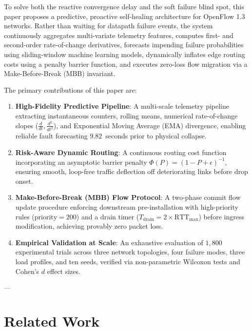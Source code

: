 \documentclass[10pt,twocolumn]{article}
\begin{document}
To solve both the reactive convergence delay and the soft failure blind spot, this paper proposes a predictive, proactive self-healing architecture for OpenFlow 1.3 networks. Rather than waiting for datapath failure events, the system continuously aggregates multi-variate telemetry features, computes first- and second-order rate-of-change derivatives, forecasts impending failure probabilities using sliding-window machine learning models, dynamically inflates edge routing costs using a penalty barrier function, and executes zero-loss flow migration via a Make-Before-Break (MBB) invariant.

The primary contributions of this paper are:
\begin{enumerate}
    \item \textbf{High-Fidelity Predictive Pipeline}: A multi-scale telemetry pipeline extracting instantaneous counters, rolling means, numerical rate-of-change slopes ($\frac{d}{dt}, \frac{d^2}{dt^2}$), and Exponential Moving Average (EMA) divergence, enabling reliable fault forecasting $9.82$~seconds prior to physical collapse.
    \item \textbf{Risk-Aware Dynamic Routing}: A continuous routing cost function incorporating an asymptotic barrier penalty $\Phi(P) = (1 - P + \epsilon)^{-1}$, ensuring smooth, loop-free traffic deflection off deteriorating links before drop onset.
    \item \textbf{Make-Before-Break (MBB) Flow Protocol}: A two-phase commit flow update procedure enforcing downstream pre-installation with high-priority rules ($\text{priority}=200$) and a drain timer ($T_{\text{drain}} = 2 \times \text{RTT}_{\max}$) before ingress modification, achieving provably zero packet loss.
    \item \textbf{Empirical Validation at Scale}: An exhaustive evaluation of $1{,}800$ experimental trials across three network topologies, four failure modes, three load profiles, and ten seeds, verified via non-parametric Wilcoxon tests and Cohen's $d$ effect sizes.
\end{enumerate}

---

\section{Related Work}
\label{sec:related}
\end{document}
